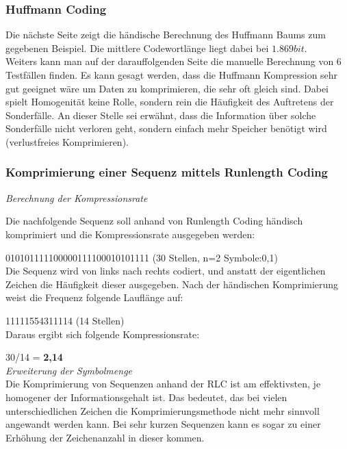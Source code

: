 \documentclass[12pt,german]{article}
\begin{document}
\subsubsection{Huffmann Coding}

Die nächste Seite zeigt die händische Berechnung des Huffmann Baums zum gegebenen Beispiel. Die mittlere Codewortlänge liegt dabei bei $1.869 bit $. \\

Weiters kann man auf der darauffolgenden Seite die manuelle Berechnung von 6 Testfällen finden. Es kann gesagt werden, dass die Huffmann Kompression sehr gut geeignet wäre um Daten zu komprimieren, die sehr oft gleich sind. Dabei spielt Homogenität keine Rolle, sondern rein die Häufigkeit des Auftretens der Sonderfälle. An dieser Stelle sei erwähnt, dass die Information über solche Sonderfälle nicht verloren geht, sondern einfach mehr Speicher benötigt wird (verlustfreies Komprimieren).


\label{fig:huffmannCalculation}


\label{fig:huffmannCalculation}


\subsubsection{Komprimierung einer Sequenz mittels Runlength Coding}
\textit{Berechnung der Kompressionsrate} 

Die nachfolgende Sequenz soll anhand von Runlength Coding händisch komprimiert und die Kompressionsrate ausgegeben werden:

010101111100000111100010101111 (30 Stellen, n=2 Symbole:0,1) \\

Die Sequenz wird von links nach rechts codiert, und anstatt der eigentlichen Zeichen die Häufigkeit dieser ausgegeben. Nach der händischen Komprimierung weist die Frequenz folgende Lauflänge auf:

11111554311114 (14 Stellen)\\


Daraus ergibt sich folgende Kompressionsrate:

30/14 = \textbf{ 2,14}\\

\textit{Erweiterung der Symbolmenge}\\
Die Komprimierung von Sequenzen anhand der RLC ist am effektivsten, je homogener der Informationsgehalt ist. Das bedeutet, das bei vielen unterschiedlichen Zeichen die Komprimierungsmethode nicht mehr sinnvoll angewandt werden kann. Bei sehr kurzen Sequenzen kann es sogar zu einer Erhöhung der Zeichenanzahl in dieser kommen.\\
\end{document}
